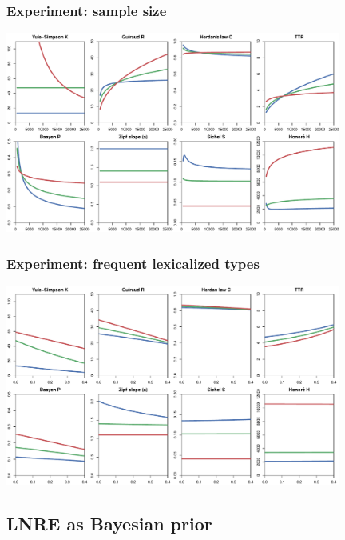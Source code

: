 \documentclass[t]{beamer} %
\begin{document}
\begin{frame}[c]
  \frametitle{Experiment: sample size}

  \centering
  \includegraphics[width=11cm]{img/lexconst_sample_size}
\end{frame}

\begin{frame}[c]
  \frametitle{Experiment: frequent lexicalized types}

  \centering
  \includegraphics[width=11cm]{img/lexconst_echo_type}
\end{frame}


\subsection{LNRE as Bayesian prior}
\end{document}
